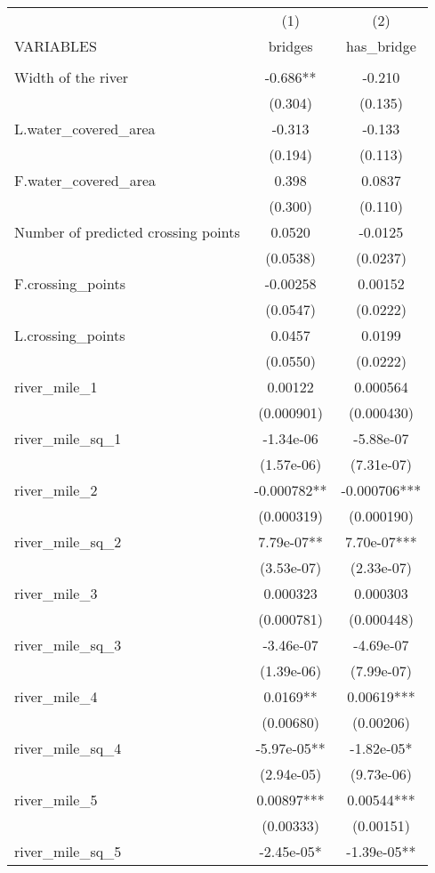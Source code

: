 \begin{tabular}{lcc} \hline
 & (1) & (2) \\
VARIABLES & bridges & has\_bridge \\ \hline
 &  &  \\
Width of the river & -0.686** & -0.210 \\
 & (0.304) & (0.135) \\
L.water\_covered\_area & -0.313 & -0.133 \\
 & (0.194) & (0.113) \\
F.water\_covered\_area & 0.398 & 0.0837 \\
 & (0.300) & (0.110) \\
Number of predicted crossing points & 0.0520 & -0.0125 \\
 & (0.0538) & (0.0237) \\
F.crossing\_points & -0.00258 & 0.00152 \\
 & (0.0547) & (0.0222) \\
L.crossing\_points & 0.0457 & 0.0199 \\
 & (0.0550) & (0.0222) \\
river\_mile\_1 & 0.00122 & 0.000564 \\
 & (0.000901) & (0.000430) \\
river\_mile\_sq\_1 & -1.34e-06 & -5.88e-07 \\
 & (1.57e-06) & (7.31e-07) \\
river\_mile\_2 & -0.000782** & -0.000706*** \\
 & (0.000319) & (0.000190) \\
river\_mile\_sq\_2 & 7.79e-07** & 7.70e-07*** \\
 & (3.53e-07) & (2.33e-07) \\
river\_mile\_3 & 0.000323 & 0.000303 \\
 & (0.000781) & (0.000448) \\
river\_mile\_sq\_3 & -3.46e-07 & -4.69e-07 \\
 & (1.39e-06) & (7.99e-07) \\
river\_mile\_4 & 0.0169** & 0.00619*** \\
 & (0.00680) & (0.00206) \\
river\_mile\_sq\_4 & -5.97e-05** & -1.82e-05* \\
 & (2.94e-05) & (9.73e-06) \\
river\_mile\_5 & 0.00897*** & 0.00544*** \\
 & (0.00333) & (0.00151) \\
river\_mile\_sq\_5 & -2.45e-05* & -1.39e-05** \\

\end{tabular}

